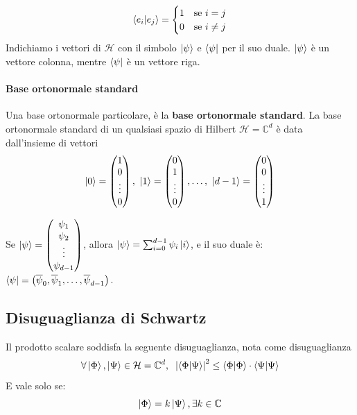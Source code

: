 $$
\braket{e_i|e_j}  = 
\begin{cases}
	1 & \text{se }i=j  \\
	0 & \text{se }i\neq j
\end{cases}
$$
%
Indichiamo i vettori di $\mathcal{H}$ con il simbolo $\ket{\psi}$ e $\bra{\psi}$ per il suo duale. $\ket{\psi}$ è un vettore colonna, mentre $\bra{\psi}$ è un vettore riga. 

\paragraph{Base ortonormale standard} Una base ortonormale particolare, è la \textbf{base ortonormale standard}.
La base ortonormale standard di un qualsiasi spazio di Hilbert $\mathcal{H}= \mathbb{C}^d$ è data dall'insieme di vettori
$$
\ket{0}=
\begin{pmatrix}
	1 \\
	0 \\
	\vdots \\
	0
\end{pmatrix}, \
\ket{1}=
\begin{pmatrix}
	0 \\
	1 \\
	\vdots \\
	0
\end{pmatrix}, \dots,\
\ket{d-1}=
\begin{pmatrix}
	0 \\
	0 \\
	\vdots \\
	1
\end{pmatrix}
$$

Se $\ket{\psi} = 
\begin{pmatrix}
	\psi_1 \\
	\psi_2 \\
	\vdots \\
	\psi_{d-1}
\end{pmatrix}
$, allora $\ket{\psi} = \sum^{d-1}_{i=0}\psi_i \ket{i}$, e il suo duale è:
$\bra{\psi} = \left(\overline{\psi}_0,\overline{\psi}_1,\dots,\overline{\psi}_{d-1} \right)$. 

\subsection{Disuguaglianza di Schwartz}
Il prodotto scalare soddisfa la seguente disuguaglianza, nota come disuguaglianza
$$\forall \ket{\Phi},\ket{\Psi} \in \mathcal{H} = \mathbb{C}^d, \hspace{0.2cm} \left|\braket{\Phi|\Psi} \right|^2 \le \braket{\Phi|\Phi} \cdot \braket{\Psi|\Psi}$$
E vale solo se: $$\ket{\Phi} = k\ket{\Psi}, \exists k \in\mathbb{C}$$


